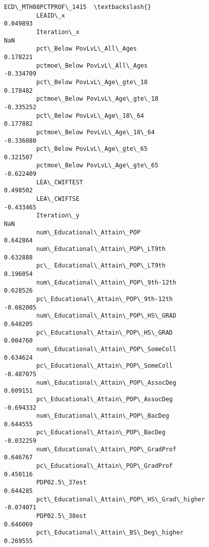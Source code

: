 \documentclass[11pt]{article}
\begin{document}
\begin{Verbatim}[commandchars=\\\{\}]
                                                    ECD\_MTH08PCTPROF\_1415  \textbackslash{}
         LEAID\_x                                                 0.049893   
         Iteration\_x                                                  NaN   
         pct\_Below PovLvL\_All\_Ages                               0.178221   
         pctmoe\_Below PovLvL\_All\_Ages                           -0.334709   
         pct\_Below PovLvL\_Age\_gte\_18                             0.178482   
         pctmoe\_Below PovLvL\_Age\_gte\_18                         -0.335252   
         pct\_Below PovLvL\_Age\_18\_64                              0.177882   
         pctmoe\_Below PovLvL\_Age\_18\_64                          -0.336080   
         pct\_Below PovLvL\_Age\_gte\_65                             0.321507   
         pctmoe\_Below PovLvL\_Age\_gte\_65                         -0.622409   
         LEA\_CWIFTEST                                            0.498502   
         LEA\_CWIFTSE                                            -0.433465   
         Iteration\_y                                                  NaN   
         num\_Educational\_Attain\_POP                              0.642864   
         num\_Educational\_Attain\_POP\_LT9th                        0.632888   
         pc\_ Educational\_Attain\_POP\_LT9th                        0.196054   
         num\_Educational\_Attain\_POP\_9th-12th                     0.628526   
         pc\_Educational\_Attain\_POP\_9th-12th                     -0.082005   
         num\_Educational\_Attain\_POP\_HS\_GRAD                      0.648205   
         pc\_Educational\_Attain\_POP\_HS\_GRAD                       0.004760   
         num\_Educational\_Attain\_POP\_SomeColl                     0.634624   
         pc\_Educational\_Attain\_POP\_SomeColl                     -0.487075   
         num\_Educational\_Attain\_POP\_AssocDeg                     0.609151   
         pc\_Educational\_Attain\_POP\_AssocDeg                     -0.694332   
         num\_Educational\_Attain\_POP\_BacDeg                       0.644555   
         pc\_Educational\_Attain\_POP\_BacDeg                       -0.032259   
         num\_Educational\_Attain\_POP\_GradProf                     0.646767   
         pc\_Educational\_Attain\_POP\_GradProf                      0.450116   
         PDP02.5\_37est                                           0.644285   
         pct\_Educational\_Attain\_POP\_HS\_Grad\_higher              -0.074071   
         PDP02.5\_38est                                           0.646069   
         pct\_Educational\_Attain\_BS\_Deg\_higher                    0.269555   

\end{Verbatim}
\end{document}

